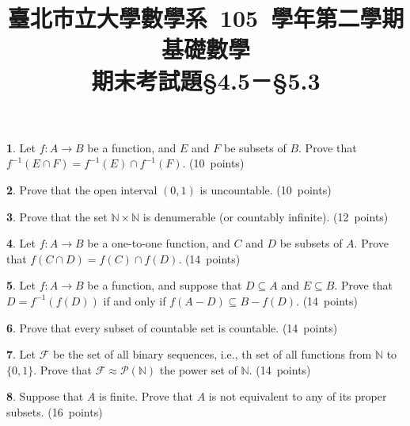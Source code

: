 \documentclass[12pt,a4paper]{article}
\theoremstyle{definition}
\newtheorem{Ex}{}
\newcommand{\set}[1]{\{#1\}}
\begin{document}
\title{\CJK%
{\normalsize 臺北市立大學數學系~105~學年第二學期}\\[4pt]
\textbf{基礎數學}\\
{\large 期末考試題}{\small \S4.5－\S5.3}%
}
\author{}
\date{\vspace{-10ex}}
\maketitle

\renewcommand{\baselinestretch}{1.5}
\renewcommand{\labelenumi}{(\arabic{enumi})}
\begin{Ex}
Let $f:A\to B$ be a function, and $E$ and $F$ be subsets of $B$. Prove that $f^{-1}(E\cap F) = f^{-1}(E) \cap f^{-1}(F)$. \quad (10~points)
\end{Ex}

\begin{Ex}
Prove that the open interval $(0,1)$ is uncountable. \quad (10~points)
\end{Ex}

\begin{Ex}
Prove that the set $\mathbb{N}\times\mathbb{N}$ is denumerable (or countably infinite). \quad (12~points)
\end{Ex}

\begin{Ex}
Let $f:A\to B$ be a one-to-one function, and $C$ and $D$ be subsets of $A$. Prove that $f(C\cap D) = f(C)\cap f(D)$. \quad (14~points)
\end{Ex}

\begin{Ex}
Let $f:A\to B$ be a function, and suppose that $D\subseteq A$ and $E\subseteq B$. Prove that $D = f^{-1}(f(D))$ if and only if $f(A-D) \subseteq B-f(D)$. \quad (14~points)
\end{Ex}

\begin{Ex}
Prove that every subset of countable set is countable. \quad (14~points)
\end{Ex}

\begin{Ex}
Let $\mathcal{F}$ be the set of all binary sequences, i.e., th set of all functions from $\mathbb{N}$ to $\set{0,1}$. Prove that $\mathcal{F}\approx\mathcal{P}(\mathbb{N})$ the power set of $\mathbb{N}$. \quad (14~points)
\end{Ex}

\begin{Ex}
Suppose that $A$ is finite. Prove that $A$ is not equivalent to any of its proper subsets. \quad (16~points)
\end{Ex}
\end{document}

